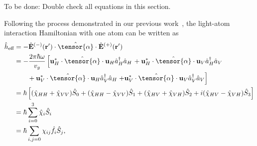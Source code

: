 \documentclass[preprint,aps,pra,onecolumn,superscriptaddress]{revtex4-1} %
\def\br{\mathbf{r}}
\newcommand{\nn}{\nonumber}
\newcommand{\eff}{\text{eff}}
\newcommand{\comment}[1]{{\color{Maroon} #1}}
\begin{document}
\comment{To be done: Double check all equations in this section.}

Following the process demonstrated in our previous work~\cite{Qi2016}, the light-atom interaction Hamiltonian with one atom can be written as
\begin{align}
\hat{h}_\eff &= -\hat{\mathbf{E}}^{(-)}(\br')\cdot\hat{\tensor{\mathbf{\alpha}}}\cdot\hat{\mathbf{E}}^{(+)}(\br')\nn\\
&= -\frac{2\pi\hbar\omega}{v_g}\left[\mathbf{u}_H^*\cdot\hat{\tensor{\mathbf{\alpha}}}\cdot \mathbf{u}_H\hat{a}_H^\dagger\hat{a}_H\right.
+ \mathbf{u}_H^*\cdot\hat{\tensor{\mathbf{\alpha}}}\cdot \mathbf{u}_V\hat{a}_H^\dagger\hat{a}_V\nn\\
&\quad\quad + \mathbf{u}_V^*\cdot\hat{\tensor{\mathbf{\alpha}}}\cdot \mathbf{u}_H\hat{a}_V^\dagger\hat{a}_H 
\left. + \mathbf{u}_V^*\cdot\hat{\tensor{\mathbf{\alpha}}}\cdot \mathbf{u}_V\hat{a}_V^\dagger\hat{a}_V\right]\\
&= \hbar\left[(\hat{\chi}_{HH}+\hat{\chi}_{VV})\hat{S}_0 + (\hat{\chi}_{HH}-\hat{\chi}_{VV})\hat{S}_1 + (\hat{\chi}_{HV}+\hat{\chi}_{VH})\hat{S}_2 + i(\hat{\chi}_{HV}-\hat{\chi}_{VH})\hat{S}_3 \right]\\
&=\hbar\sum_{i=0}^3 \hat{\chi}_{i}\hat{S}_i\\
&=\hbar\sum_{i,j=0} \chi_{ij}\hat{f}_i\hat{S}_j,
\end{align}
\end{document}
